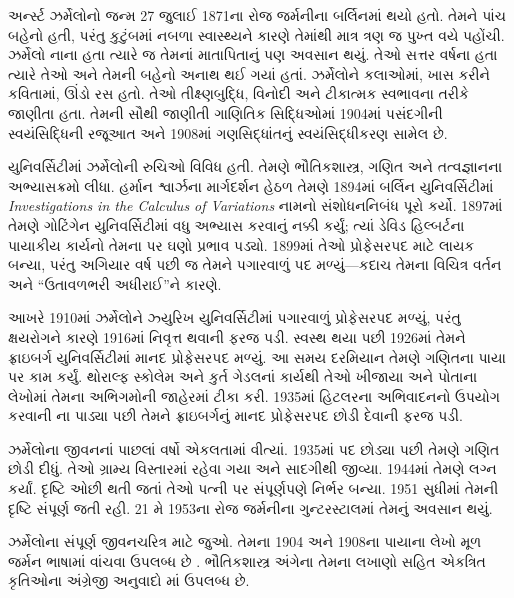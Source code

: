 \documentclass[../../../include/open-logic-section]{subfiles}
\begin{document}



અર્ન્સ્ટ ઝર્મેલોનો જન્મ 27 જુલાઈ
1871ના રોજ જર્મનીના બર્લિનમાં
થયો હતો. તેમને પાંચ બહેનો
હતી, પરંતુ કુટુંબમાં નબળા
સ્વાસ્થ્યને કારણે તેમાંથી
માત્ર ત્રણ જ પુખ્ત વયે
પહોંચી. ઝર્મેલો નાના હતા
ત્યારે જ તેમનાં માતાપિતાનું
પણ અવસાન થયું. તેઓ સત્તર
વર્ષના હતા ત્યારે તેઓ અને
તેમની બહેનો અનાથ થઈ
ગયાં હતાં. ઝર્મેલોને કલાઓમાં,
ખાસ કરીને કવિતામાં,
ઊંડો રસ હતો. તેઓ
તીક્ષ્ણબુદ્ધિ, વિનોદી અને
ટીકાત્મક સ્વભાવના
તરીકે જાણીતા હતા.
તેમની સૌથી જાણીતી
ગાણિતિક સિદ્ધિઓમાં
1904માં પસંદગીની
સ્વયંસિદ્ધિની રજૂઆત
અને 1908માં ગણસિદ્ધાંતનું
સ્વયંસિદ્ધીકરણ સામેલ છે.

યુનિવર્સિટીમાં ઝર્મેલોની
રુચિઓ વિવિધ હતી. તેમણે
ભૌતિકશાસ્ત્ર, ગણિત અને
તત્વજ્ઞાનના અભ્યાસક્રમો
લીધા. હર્માન શ્વાર્ઝના
માર્ગદર્શન હેઠળ તેમણે
1894માં બર્લિન
યુનિવર્સિટીમાં
\emph{Investigations in
  the Calculus of Variations}
નામનો સંશોધનનિબંધ
પૂરો કર્યો. 1897માં
તેમણે ગોટિંગેન
યુનિવર્સિટીમાં વધુ
અભ્યાસ કરવાનું નક્કી
કર્યું; ત્યાં ડેવિડ
હિલ્બર્ટના પાયાકીય
કાર્યનો તેમના પર
ઘણો પ્રભાવ પડ્યો.
1899માં તેઓ પ્રોફેસરપદ
માટે લાયક બન્યા,
પરંતુ અગિયાર વર્ષ
પછી જ તેમને પગારવાળું પદ
મળ્યું—કદાચ તેમના
વિચિત્ર વર્તન અને
“ઉતાવળભરી અધીરાઈ”ને
કારણે.

આખરે 1910માં ઝર્મેલોને
ઝ્યુરિખ યુનિવર્સિટીમાં
પગારવાળું પ્રોફેસરપદ
મળ્યું, પરંતુ ક્ષયરોગને
કારણે 1916માં નિવૃત્ત
થવાની ફરજ પડી.
સ્વસ્થ થયા પછી 1926માં
તેમને ફ્રાઇબર્ગ
યુનિવર્સિટીમાં માનદ
પ્રોફેસરપદ મળ્યું.
આ સમય દરમિયાન તેમણે
ગણિતના પાયા પર કામ
કર્યું. થોરાલ્ફ સ્કોલેમ
અને કુર્ત ગેડલનાં
કાર્યથી તેઓ ખીજાયા
અને પોતાના લેખોમાં
તેમના અભિગમોની
જાહેરમાં ટીકા કરી.
1935માં હિટલરના અભિવાદનનો
ઉપયોગ કરવાની ના પાડ્યા પછી
તેમને ફ્રાઇબર્ગનું માનદ
પ્રોફેસરપદ છોડી દેવાની
ફરજ પડી.
 
ઝર્મેલોના જીવનનાં
પાછલાં વર્ષો એકલતામાં
વીત્યાં. 1935માં પદ
છોડ્યા પછી તેમણે
ગણિત છોડી દીધું.
તેઓ ગ્રામ્ય વિસ્તારમાં
રહેવા ગયા અને સાદગીથી
જીવ્યા. 1944માં તેમણે
લગ્ન કર્યાં. દૃષ્ટિ
ઓછી થતી જતાં તેઓ
પત્ની પર સંપૂર્ણપણે
નિર્ભર બન્યા. 1951
સુધીમાં તેમની દૃષ્ટિ
સંપૂર્ણ જતી રહી.
21 મે 1953ના રોજ
જર્મનીના ગુન્ટરસ્ટાલમાં
તેમનું અવસાન થયું.


\begin{reading}
ઝર્મેલોના સંપૂર્ણ
જીવનચરિત્ર માટે
\citet{Ebbinghaus2015}
જુઓ. તેમના 1904
અને 1908ના પાયાના
લેખો મૂળ જર્મન
ભાષામાં વાંચવા
ઉપલબ્ધ છે
\citep{Zermelo1904,Zermelo1908}.
ભૌતિકશાસ્ત્ર અંગેના
તેમના લખાણો સહિત
એકત્રિત કૃતિઓના
અંગ્રેજી અનુવાદો
\citep{Ebbinghaus2010,Ebbinghaus2013}માં
ઉપલબ્ધ છે.
\end{reading}
\end{document}
